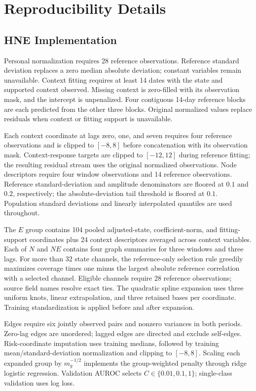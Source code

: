 \section{Reproducibility Details}
\label{app:reproducibility}

\subsection{HNE Implementation}
Personal normalization requires 28 reference observations. Reference standard deviation replaces a zero median absolute deviation; constant variables remain unavailable. Context fitting requires at least 14 dates with the state and supported context observed. Missing context is zero-filled with its observation mask, and the intercept is unpenalized. Four contiguous 14-day reference blocks are each predicted from the other three blocks. Original normalized values replace residuals when context or fitting support is unavailable.

Each context coordinate at lags zero, one, and seven requires four reference observations and is clipped to $[-8,8]$ before concatenation with its observation mask. Context-response targets are clipped to $[-12,12]$ during reference fitting; the resulting residual stream uses the original normalized observations. Node descriptors require four window observations and 14 reference observations. Reference standard-deviation and amplitude denominators are floored at $0.1$ and $0.2$, respectively; the absolute-deviation tail threshold is floored at $0.1$. Population standard deviations and linearly interpolated quantiles are used throughout.

The $E$ group contains 104 pooled adjusted-state, coefficient-norm, and fitting-support coordinates plus 24 context descriptors averaged across context variables. Each of $N$ and $NE$ contains four graph summaries for three windows and three lags. For more than 32 state channels, the reference-only selection rule greedily maximizes coverage times one minus the largest absolute reference correlation with a selected channel. Eligible channels require 28 reference observations; source field names resolve exact ties. The quadratic spline expansion uses three uniform knots, linear extrapolation, and three retained bases per coordinate. Training standardization is applied before and after expansion.

Edges require six jointly observed pairs and nonzero variances in both periods. Zero-lag edges are unordered; lagged edges are directed and exclude self-edges. Risk-coordinate imputation uses training medians, followed by training mean/standard-deviation normalization and clipping to $[-8,8]$. Scaling each expanded group by $m_g^{-1/2}$ implements the group-weighted penalty through ridge logistic regression. Validation AUROC selects $C\in\{0.01,0.1,1\}$; single-class validation uses log loss.


